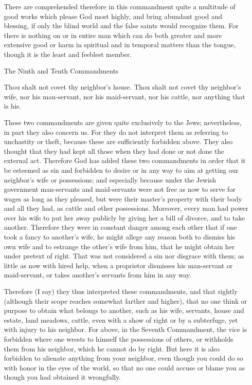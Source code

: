 There are comprehended therefore in this commandment quite a multitude
of good works which please God most highly, and bring abundant good and
blessing, if only the blind world and the false saints would recognize
them. For there is nothing on or in entire man which can do both
greater and more extensive good or harm in spiritual and in temporal
matters than the tongue, though it is the least and feeblest member.

The Ninth and Tenth Commandments

Thou shalt not covet thy neighbor's house. Thou shalt not covet thy
neighbor's wife, nor his man-servant, nor his maid-servant, nor his
cattle, nor anything that is his.

These two commandments are given quite exclusively to the Jews;
nevertheless, in part they also concern us. For they do not interpret
them as referring to unchastity or theft, because these are
sufficiently forbidden above. They also thought that they had kept all
those when they had done or not done the external act. Therefore God
has added these two commandments in order that it be esteemed as sin
and forbidden to desire or in any way to aim at getting our neighbor's
wife or possessions; and especially because under the Jewish government
man-servants and maid-servants were not free as now to serve for wages
as long as they pleased, but were their master's property with their
body and all they had, as cattle and other possessions. Moreover,
every man had power over his wife to put her away publicly by giving
her a bill of divorce, and to take another. Therefore they were in
constant danger among each other that if one took a fancy to another's
wife, he might allege any reason both to dismiss his own wife and to
estrange the other's wife from him, that he might obtain her under
pretext of right. That was not considered a sin nor disgrace with them;
as little as now with hired help, when a proprietor dismisses his
man-servant or maid-servant, or takes another's servants from him in
any way.

Therefore (I say) they thus interpreted these commandments, and that
rightly (although their scope reaches somewhat farther and higher),
that no one think or purpose to obtain what belongs to another, such as
his wife, servants, house and estate, land meadows, cattle, even with a
show of right or by a subterfuge, yet with injury to his neighbor. For
above, in the Seventh Commandment, the vice is forbidden where one
wrests to himself the possessions of others, or withholds them from his
neighbor, which he cannot do by right. But here it is also forbidden to
alienate anything from your neighbor, even though you could do so with
honor in the eyes of the world, so that no one could accuse or blame
you as though you had obtained it wrongfully.

